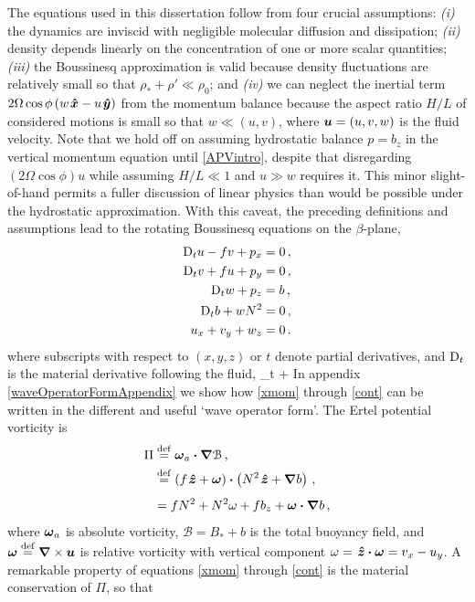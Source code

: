 \documentclass[12pt, oneside]{book}
\begin{document}
The equations used in this dissertation follow from four crucial assumptions: \textit{(i)} the dynamics are inviscid with negligible molecular diffusion and dissipation; \textit{(ii)} density depends linearly on the concentration of one or more scalar quantities; \textit{(iii)} the Boussinesq approximation is valid because density fluctuations are relatively small so that $\rho_*+\rho' \ll \rho_0$; and \textit{(iv)} we can neglect the inertial term $2 \Omega \cos \phi \left ( w \hspace{0.1em} \boldsymbol{\hat x} - u \hspace{0.1em}\boldsymbol{\hat y} \right )$ from the momentum balance because the aspect ratio $H/L$ of considered motions is small so that $w \ll (u,v)$, where $\boldsymbol u=(u,v,w)$ is the fluid velocity.  Note that we hold off on assuming hydrostatic balance $p=b_z$ in the vertical momentum equation until \ch \ref{APVintro}, despite that disregarding $\left ( 2 \Omega \cos \phi \right ) u$ while assuming $H/L \ll 1$ and $u \gg w$ requires it.  This minor slight-of-hand permits a fuller discussion of linear physics than would be possible under the hydrostatic approximation.  With this caveat, the preceding definitions and assumptions lead to the rotating Boussinesq equations on the $\beta$-plane, 
\begin{align}
\mathrm{D}_t u - f v + p_x &=0 \, , \label{xmom} \\
\mathrm{D}_t v  +f u + p_y &=0 \, , \label{ymom} \\
\mathrm{D}_t w + p_z &=b \, , \label{zmom} \\
\mathrm{D}_t b + wN^2&=0 \, , \label{buoy} \\
u_x+v_y+w_z &=0 \, . \label{cont}
\end{align}
where subscripts with respect to $(x,y,z)$ or $t$ denote partial derivatives, and $\mathrm{D}_t$ is the material derivative following the fluid,
\beq
\Dt{}  \p_t + \bu \bcdot \bnabla \per
\eeq
In appendix \ref{waveOperatorFormAppendix} we show how \eqref{xmom} through \eqref{cont} can be written in the different and useful `wave operator form'.  The Ertel potential vorticity is 
\begin{align}
\Pi &\stackrel{\mathrm{def}}{=} \boldsymbol \omega_a \boldsymbol \cdot \boldsymbol \nabla \mathcal{B} \, , \label{PiDef1} \\
&\stackrel{\mathrm{def}}{=}  \left ( f \hspace{0.1em}\boldsymbol{\hat z} + \boldsymbol \omega \right ) \boldsymbol \cdot \left ( N^2 \hspace{0.1em}\boldsymbol{\hat z} + \boldsymbol \nabla b \right )\, , \label{PiDef2} \\[1ex]
&= f N^2 + N^2 \omega + f b_z + \boldsymbol \omega \boldsymbol \cdot \boldsymbol \nabla b \, , \label{PiDef3}
\end{align}
where $\boldsymbol \omega_a$ is absolute vorticity, $\mathcal{B}=B_*+b$ is the total buoyancy field, and $\boldsymbol \omega \stackrel{\mathrm{def}}{=} \boldsymbol \nabla \times \boldsymbol u$ is relative vorticity with vertical component $\omega = \hspace{0.1em}\boldsymbol{\hat z} \boldsymbol \cdot \boldsymbol \omega = v_x - u_y$.   A remarkable property of equations \eqref{xmom} through \eqref{cont} is the material conservation of $\Pi$, so that 
\end{document}
